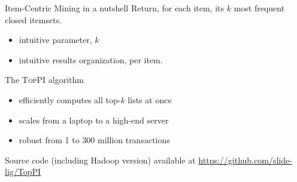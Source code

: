 \documentclass[table]{beamer}
\providecommand{\toppi}{\mbox{\textsc{TopPI}} }
\begin{document}
\begin{frame}{Item-Centric Mining in a nutshell}
  Return, for each item, its $k$ most frequent closed itemsets.

  \begin{itemize}
    \item intuitive parameter, $k$
    \item intuitive results organization, per item.
  \end{itemize}

  \vspace{1em}
  The \toppi algorithm
  \begin{itemize}
    \item efficiently computes all top-$k$ lists at once
    \item scales from a laptop to a high-end server
    \item robust from 1 to 300 million transactions
  \end{itemize}

  \begin{center}
  \vspace{1em}
    Source code (including Hadoop version) available at
    \url{https://github.com/slide-lig/TopPI}
  \end{center}
\end{frame}
\end{document}
